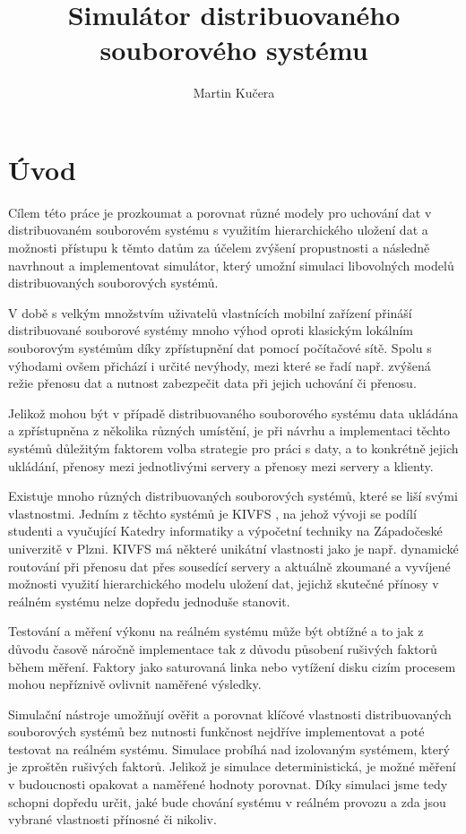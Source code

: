 \documentclass[czech,DP]{thesiskiv}
\author{Martin Kučera}
\title{Simulátor distribuovaného souborového systému}
\begin{document}
%
\maketitle
{}
\tableofcontents
\cleardoublepage
{}

\chapter{Úvod}

Cílem této práce je prozkoumat a porovnat různé modely pro uchování dat v distribuovaném souborovém systému s využitím hierarchického uložení dat a možnosti přístupu k těmto datům za účelem zvýšení propustnosti a následně navrhnout a implementovat simulátor, který umožní simulaci libovolných modelů distribuovaných souborových systémů.

V době s velkým množstvím uživatelů vlastnících mobilní zařízení přináší distribuované souborové systémy mnoho výhod oproti klasickým lokálním souborovým systémům díky zpřístupnění dat pomocí počítačové sítě. Spolu s výhodami ovšem přichází i určité nevýhody, mezi které se řadí např. zvýšená režie přenosu dat a nutnost zabezpečit data při jejich uchování či přenosu.

Jelikož mohou být v případě distribuovaného souborového systému data ukládána a zpřístupněna z několika různých umístění, je při návrhu a implementaci těchto systémů důležitým faktorem volba strategie pro práci s daty, a to konkrétně jejich ukládání, přenosy mezi jednotlivými servery a přenosy mezi servery a klienty. 

Existuje mnoho různých distribuovaných souborových systémů, které se liší svými vlastnostmi. Jedním z těchto systémů je KIVFS \cite{kivfspaper}, na jehož vývoji se podílí studenti a vyučující Katedry informatiky a výpočetní techniky na Západočeské univerzitě v Plzni. KIVFS má některé unikátní vlastnosti jako je např. dynamické routování při přenosu dat přes sousedící servery a aktuálně zkoumané a vyvíjené možnosti využití hierarchického modelu uložení dat, jejichž skutečné přínosy v reálném systému nelze dopředu jednoduše stanovit.

Testování a měření výkonu na reálném systému může být obtížné a to jak z důvodu časově náročně implementace tak z důvodu působení rušivých faktorů během měření. Faktory jako saturovaná linka nebo vytížení disku cizím procesem mohou nepříznivě ovlivnit naměřené výsledky.

Simulační nástroje umožňují ověřit a porovnat klíčové vlastnosti distribuovaných souborových systémů bez nutnosti funkčnost nejdříve implementovat a poté testovat na reálném systému. Simulace probíhá nad izolovaným systémem, který je zproštěn rušivých faktorů. Jelikož je simulace deterministická, je možné měření v budoucnosti opakovat a naměřené hodnoty porovnat. Díky simulaci jsme tedy schopni dopředu určit, jaké bude chování systému v reálném provozu a zda jsou vybrané vlastnosti přínosné či nikoliv.
\end{document}
